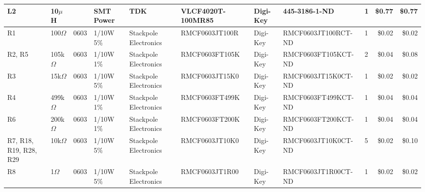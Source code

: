 \documentclass{article}
\begin{document}
\begin{center}
\begin{tabular}{| l | l | l | l | l | l | l | l | l | r | r |}
      \hline
      L2                      &  10$\mu$H        &                    &  SMT Power                                &  TDK                    &  VLCF4020T-100MR85              &  Digi-Key           &  445-3186-1-ND               &  1             &  \$0.77              &  \$0.77 \\
      \hline
      R1                      &  100$\Omega$     &  0603              &  1/10W 5\%                                &  Stackpole Electronics  &  RMCF0603JT100R                 &  Digi-Key           &  RMCF0603JT100RCT-ND         &  1             &  \$0.02              &  \$0.02 \\
      \hline
      R2, R5                  &  105k$\Omega$    &  0603              &  1/10W 1\%                                &  Stackpole Electronics  &  RMCF0603FT105K                 &  Digi-Key           &  RMCF0603FT105KCT-ND         &  2             &  \$0.04              &  \$0.08 \\
      \hline
      R3                      &  15k$\Omega$     &  0603              &  1/10W 5\%                                &  Stackpole Electronics  &  RMCF0603JT15K0                 &  Digi-Key           &  RMCF0603JT15K0CT-ND         &  1             &  \$0.02              &  \$0.02 \\
      \hline
      R4                      &  499k$\Omega$    &  0603              &  1/10W 1\%                                &  Stackpole Electronics  &  RMCF0603FT499K                 &  Digi-Key           &  RMCF0603FT499KCT-ND         &  1             &  \$0.04              &  \$0.04 \\
      \hline
      R6                      &  200k$\Omega$    &  0603              &  1/10W 1\%                                &  Stackpole Electronics  &  RMCF0603FT200K                 &  Digi-Key           &  RMCF0603FT200KCT-ND         &  1             &  \$0.04              &  \$0.04 \\
      \hline
      R7, R18, R19, R28, R29  &  10k$\Omega$     &  0603              &  1/10W 5\%                                &  Stackpole Electronics  &  RMCF0603JT10K0                 &  Digi-Key           &  RMCF0603JT10K0CT-ND         &  5             &  \$0.02              &  \$0.10 \\
      \hline
      R8                      &  1$\Omega$       &  0603              &  1/10W 5\%                                &  Stackpole Electronics  &  RMCF0603JT1R00                 &  Digi-Key           &  RMCF0603JT1R00CT-ND         &  1             &  \$0.02              &  \$0.02 \\

\end{tabular}
\end{center}
\end{document}
